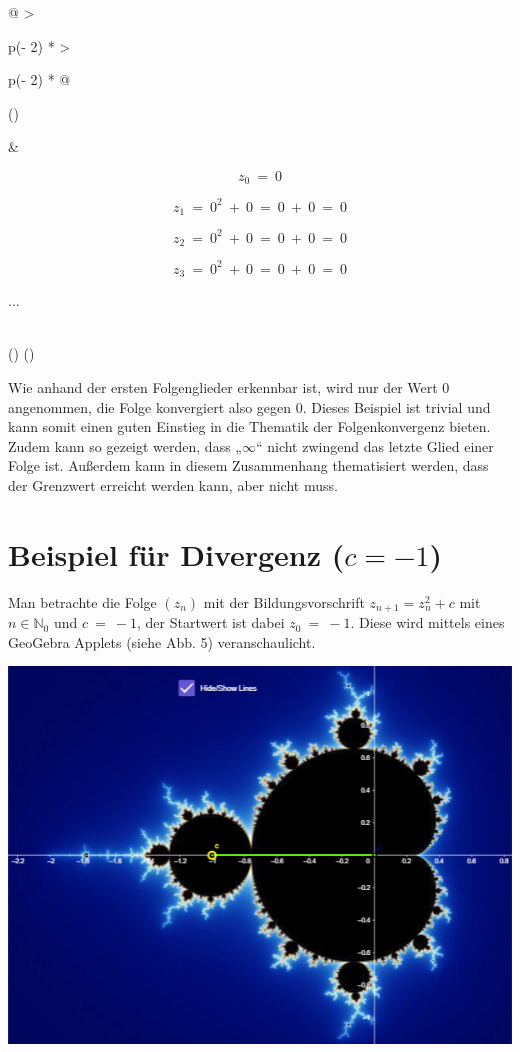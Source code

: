 \documentclass[a4paper, 12pt]{book}
\begin{document}
\begin{longtable}[]{@{}
  >{\raggedright\arraybackslash}p{(\columnwidth - 2\tabcolsep) * }
  >{\raggedright\arraybackslash}p{(\columnwidth - 2\tabcolsep) * }@{}}
\toprule()
\begin{minipage}[b]{\linewidth}\raggedright
\end{minipage} & \begin{minipage}[b]{\linewidth}\raggedright
\[z_{0}\  = \ 0\]

\[z_{1}\  = \ 0^{2}\  + \ 0\  = \ 0\  + \ 0\  = \ 0\]

\[z_{2}\  = \ 0^{2}\  + \ 0\  = \ 0\  + \ 0\  = \ 0\]

\[z_{3}\  = \ 0^{2}\  + \ 0\  = \ 0\  + \ 0\  = \ 0\]

...
\end{minipage} \\
\midrule()
\endhead
\bottomrule()
\end{longtable}

Wie anhand der ersten Folgenglieder erkennbar ist, wird nur der Wert 0
angenommen, die Folge konvergiert also gegen 0. Dieses Beispiel ist
trivial und kann somit einen guten Einstieg in die Thematik der
Folgenkonvergenz bieten. Zudem kann so gezeigt werden, dass
„\(\infty\)`` nicht zwingend das letzte Glied einer Folge ist. Außerdem
kann in diesem Zusammenhang thematisiert werden, dass der Grenzwert
erreicht werden kann, aber nicht muss.

\section{Beispiel für Divergenz ($c=-1$)}

Man betrachte die Folge \(\left( z_{n} \right)\) mit der
Bildungsvorschrift \(z_{n + 1} = z_{n}^{2} + c\) mit
\(n \in \mathbb{N}_{0}\) und \(c\  = \  - 1\), der Startwert ist dabei
\(z_{0}\  = \  - 1\). Diese wird mittels eines GeoGebra Applets (siehe
Abb. 5) veranschaulicht.

\includegraphics[width=\linewidth]{image10.png}
\end{document}
